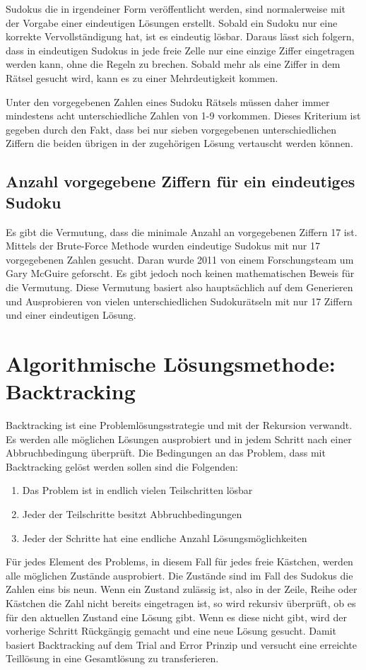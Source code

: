 Sudokus die in irgendeiner Form veröffentlicht werden, sind normalerweise mit der Vorgabe einer eindeutigen Lösungen erstellt. Sobald ein Sudoku nur eine korrekte Vervollständigung hat, ist es eindeutig lösbar. Daraus lässt sich folgern, dass in eindeutigen Sudokus in jede freie Zelle nur eine einzige Ziffer eingetragen werden kann, ohne die Regeln zu brechen. Sobald mehr als eine Ziffer in dem Rätsel gesucht wird, kann es zu einer Mehrdeutigkeit kommen. 

Unter den vorgegebenen Zahlen eines Sudoku Rätsels müssen daher immer mindestens acht unterschiedliche Zahlen von 1-9 vorkommen. Dieses Kriterium ist gegeben durch den Fakt, dass bei nur sieben vorgegebenen unterschiedlichen Ziffern die beiden übrigen in der zugehörigen Lösung vertauscht werden können. \cite{HerzbergMurty}

\subsection{Anzahl vorgegebene Ziffern für ein eindeutiges Sudoku}  
Es gibt die Vermutung, dass die minimale Anzahl an vorgegebenen Ziffern 17 ist. Mittels der Brute-Force Methode wurden eindeutige Sudokus mit nur 17 vorgegebenen Zahlen gesucht. Daran wurde 2011 von einem Forschungsteam um Gary McGuire geforscht. Es gibt jedoch noch keinen mathematischen Beweis für die Vermutung. Diese Vermutung basiert also hauptsächlich auf dem Generieren und Ausprobieren von vielen unterschiedlichen Sudokurätseln mit nur 17 Ziffern und einer eindeutigen Lösung. \cite{FAZ}

\section{Algorithmische Lösungsmethode: Backtracking}
Backtracking ist eine Problemlösungsstrategie und mit der Rekursion verwandt. Es werden alle möglichen Lösungen ausprobiert und in jedem Schritt nach einer Abbruchbedingung überprüft. Die Bedingungen an das Problem, dass mit Backtracking gelöst werden sollen sind die Folgenden: 
\begin{enumerate}
	\item Das Problem ist in endlich vielen Teilschritten lösbar
	\item Jeder der Teilschritte besitzt Abbruchbedingungen
	\item Jeder der Schritte hat eine endliche Anzahl Lösungsmöglichkeiten
\end{enumerate}

Für jedes Element des Problems, in diesem Fall für jedes freie Kästchen, werden alle möglichen Zustände ausprobiert. Die Zustände sind im Fall des Sudokus die Zahlen eins bis neun. Wenn ein Zustand zulässig ist, also in der Zeile, Reihe oder Kästchen die Zahl nicht bereits eingetragen ist, so wird rekursiv überprüft, ob es für den aktuellen Zustand eine Lösung gibt. Wenn es diese nicht gibt, wird der vorherige Schritt Rückgängig gemacht und eine neue Lösung gesucht. 
Damit basiert Backtracking auf dem Trial and Error Prinzip und versucht eine erreichte Teillösung in eine Gesamtlösung zu transferieren. 

